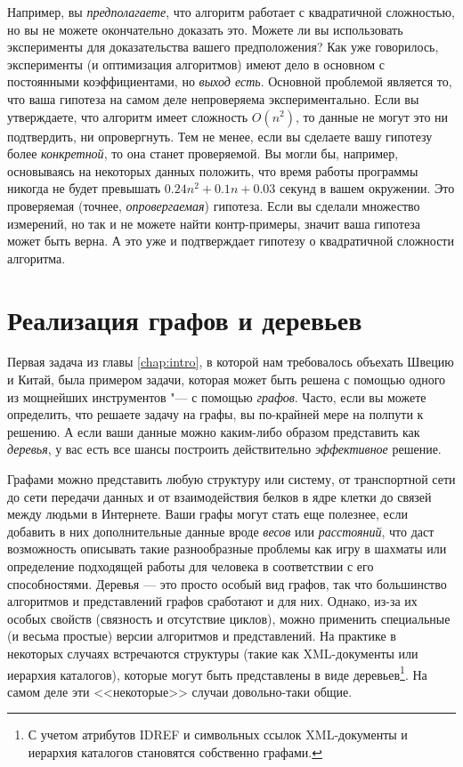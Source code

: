 Например, вы \textit{предполагаете}, что алгоритм работает с квадратичной сложностью, но вы не можете окончательно доказать это. Можете ли вы использовать эксперименты для доказательства вашего предположения? Как уже говорилось, эксперименты (и оптимизация алгоритмов) имеют дело в основном с постоянными коэффициентами, но \textit{выход есть}. Основной проблемой является то, что ваша гипотеза на самом деле непроверяема экспериментально. Если вы утверждаете, что алгоритм имеет сложность $O(n^2)$, то данные не могут это ни подтвердить, ни опровергнуть. Тем не менее, если вы сделаете вашу гипотезу более \textit{конкретной}, то она станет проверяемой. Вы могли бы, например, основываясь на некоторых данных положить, что время работы программы никогда не будет превышать $0.24n^2+0.1n+0.03$ секунд в вашем окружении. Это проверяемая (точнее, \textit{опровергаемая}) гипотеза. Если вы сделали множество измерений, но так и не можете найти контр-примеры, значит ваша гипотеза может быть верна. А это уже и подтверждает гипотезу о квадратичной сложности алгоритма.

\section{Реализация графов и деревьев }
\label{sec:implementing-graphs-and-trees}
Первая задача из главы \ref{chap:intro}, в которой нам требовалось объехать Швецию и Китай, была примером задачи, которая может быть решена с помощью одного из мощнейших инструментов "--- с помощью \textit{графов}. Часто, если вы можете определить, что решаете задачу на графы, вы по-крайней мере на полпути к решению. А если ваши данные можно каким-либо образом представить как \textit{деревья}, у вас есть все шансы построить действительно \textit{эффективное} решение.

Графами можно представить любую структуру или систему, от транспортной сети до сети передачи данных и от взаимодействия белков в ядре клетки до связей между людьми в Интернете.
Ваши графы могут стать еще полезнее, если добавить в них дополнительные данные вроде \textit{весов} или \textit{расстояний}, что даст возможность описывать такие разнообразные проблемы как игру в шахматы или определение подходящей работы для человека в соответствии с его способностями.
Деревья — это просто особый вид графов, так что большинство алгоритмов и представлений графов сработают и для них.
Однако, из-за их особых свойств (связность и отсутствие циклов), можно применить специальные (и весьма простые) версии алгоритмов и представлений.
На практике в некоторых случаях встречаются структуры (такие как XML-документы или иерархия каталогов), которые могут быть представлены в виде деревьев\footnote{С учетом атрибутов IDREF и символьных ссылок XML-документы и иерархия каталогов становятся собственно графами.}. На самом деле эти <<некоторые>> случаи довольно-таки общие.

